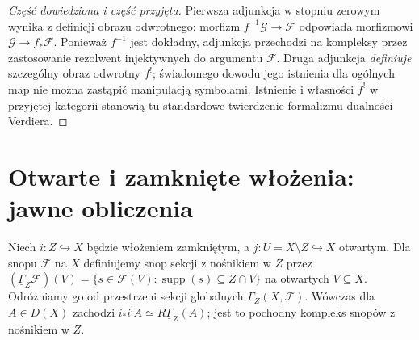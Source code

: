\documentclass[11pt,a4paper,oneside]{report}
\theoremstyle{plain}
\theoremstyle{definition}
\theoremstyle{remark}
\begin{document}
\begin{proof}[Część dowiedziona i część przyjęta]
Pierwsza adjunkcja w stopniu zerowym wynika z definicji obrazu
odwrotnego: morfizm $f^{-1}\mathcal G\to\mathcal F$
odpowiada morfizmowi $\mathcal G\to f_*\mathcal F$.
Ponieważ $f^{-1}$ jest dokładny, adjunkcja przechodzi na
kompleksy przez zastosowanie rezolwent injektywnych do
argumentu $\mathcal F$.
Druga adjunkcja \emph{definiuje} szczególny obraz odwrotny $f^!$;
świadomego dowodu jego istnienia dla ogólnych map nie można
zastąpić manipulacją symbolami. Istnienie i własności $f^!$
w przyjętej kategorii stanowią tu standardowe twierdzenie
formalizmu dualności Verdiera.
\end{proof}

\section{Otwarte i zamknięte włożenia: jawne obliczenia}
Niech $i:Z\hookrightarrow X$ będzie włożeniem zamkniętym,
a $j:U=X\setminus Z\hookrightarrow X$ otwartym.
Dla snopu $\mathcal F$ na $X$ definiujemy snop sekcji
z nośnikiem w $Z$ przez
$(\underline\Gamma_Z\mathcal F)(V)=
\{s\in\mathcal F(V):\operatorname{supp}(s)\subseteq Z\cap V\}$
na otwartych $V\subseteq X$. Odróżniamy go od przestrzeni
sekcji globalnych $\Gamma_Z(X,\mathcal F)$.
Wówczas dla $A\in D(X)$ zachodzi
$i_*i^!A\simeq R\underline\Gamma_Z(A)$;
jest to pochodny kompleks snopów z nośnikiem w $Z$.
\end{document}
